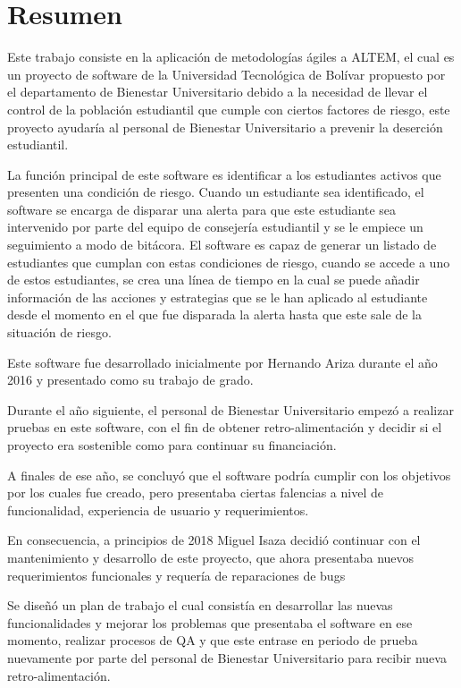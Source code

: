 \chapter*{Resumen} 

Este trabajo consiste en la aplicación de metodologías ágiles a ALTEM, el cual es un proyecto de software de la Universidad Tecnológica de Bolívar propuesto por el departamento de Bienestar Universitario debido a la necesidad de llevar el control de la población estudiantil que cumple con ciertos factores de riesgo, este proyecto ayudaría al personal de Bienestar Universitario a prevenir la deserción estudiantil.

La función principal de este software es identificar a los estudiantes activos que presenten una condición de riesgo. Cuando un estudiante sea identificado, el software se encarga de disparar una alerta para que este estudiante sea intervenido por parte del equipo de consejería estudiantil y se le empiece un seguimiento a modo de bitácora. 
El software es capaz de generar un listado de estudiantes que cumplan con estas condiciones de riesgo, cuando se accede a uno de estos estudiantes, se crea una línea de tiempo en la cual se puede añadir información de las acciones y estrategias que se le han aplicado al estudiante desde el momento en el que fue disparada la alerta hasta que este sale de la situación de riesgo. 

Este software fue desarrollado inicialmente por Hernando Ariza durante el año 2016 y presentado como su trabajo de grado. 

Durante el año siguiente, el personal de Bienestar Universitario empezó a realizar pruebas en este software, con el fin de obtener retro-alimentación y decidir si el proyecto era sostenible como para continuar su financiación. 

A finales de ese año, se concluyó que el software podría cumplir con los objetivos por los cuales fue creado, pero presentaba ciertas falencias a nivel de funcionalidad, experiencia de usuario y requerimientos.

En consecuencia, a principios de 2018 Miguel Isaza decidió continuar con el mantenimiento y desarrollo de este proyecto, que ahora presentaba nuevos requerimientos funcionales y requería de reparaciones de bugs

Se diseñó un plan de trabajo el cual consistía en desarrollar las nuevas funcionalidades y mejorar los problemas que presentaba el software en ese momento, realizar procesos de QA y que este entrase en periodo de prueba nuevamente por parte del personal de Bienestar Universitario para recibir nueva retro-alimentación. 
